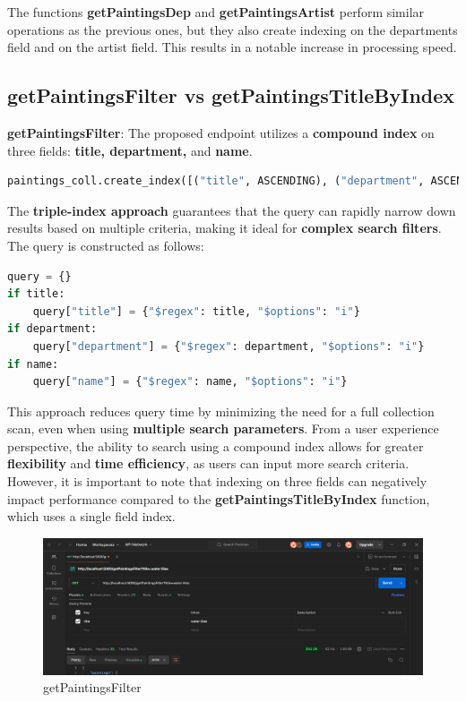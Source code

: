 \documentclass[a4paper,12pt]{article}
\begin{document}
The functions \textbf{getPaintingsDep} and \textbf{getPaintingsArtist} perform similar operations as the previous ones, but they also create indexing on the departments field and on the artist field. This results in a notable increase in processing speed.

\subsection{getPaintingsFilter vs getPaintingsTitleByIndex}
\textbf{getPaintingsFilter}: The proposed endpoint utilizes a \textbf{compound index} on three fields: \textbf{title, department,} and \textbf{name}.
\begin{lstlisting}[language=Python]
paintings_coll.create_index([("title", ASCENDING), ("department", ASCENDING), ("name", ASCENDING)], name="triple_index")
\end{lstlisting}
The \textbf{triple-index approach} guarantees that the query can rapidly narrow down results based on multiple criteria, making it ideal for \textbf{complex search filters}. The query is constructed as follows:
\begin{lstlisting}[language=Python]
query = {}
if title:
    query["title"] = {"$regex": title, "$options": "i"}
if department:
    query["department"] = {"$regex": department, "$options": "i"}
if name:
    query["name"] = {"$regex": name, "$options": "i"}
\end{lstlisting}
This approach reduces query time by minimizing the need for a full collection scan, even when using \textbf{multiple search parameters}. From a user experience perspective, the ability to search using a compound index allows for greater \textbf{flexibility} and \textbf{time efficiency}, as users can input more search criteria. However, it is important to note that indexing on three fields can negatively impact performance compared to the \textbf{getPaintingsTitleByIndex} function, which uses a single field index.

\begin{figure}[h]
      \centering
      \includegraphics[width=1\textwidth]{images/getPaintingsFilterS.png}
      \caption{getPaintingsFilter}
\end{figure}
\end{document}
